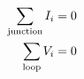 

\vspace*{\fill}
\centering

\begin{align*}
   \sum_{\rm junction} I_{i} = 0 \\
   \sum_{\rm loop} V_{i} = 0
\end{align*}

\centering
\vspace*{\fill}

